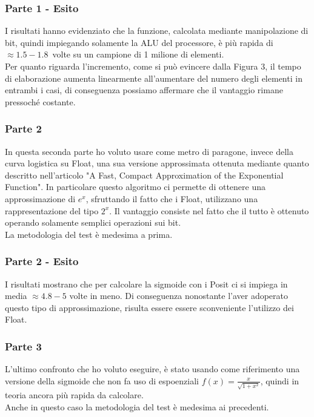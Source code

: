 \documentclass[a4paper,11pt]{article}
\begin{document}
\subsubsection{Parte 1 - Esito}


I risultati hanno evidenziato che la funzione, calcolata mediante manipolazione di bit, quindi impiegando solamente la ALU del processore, è più rapida di $\approx1.5-1.8$\ volte su un campione di 1 milione di elementi. \\
Per quanto riguarda l'incremento, come si può evincere dalla Figura 3, il tempo di elaborazione aumenta linearmente all'aumentare del numero degli elementi in entrambi i casi, di conseguenza possiamo affermare che il vantaggio rimane pressoché costante.

 
\subsubsection{Parte 2}

In questa seconda parte ho voluto usare come metro di paragone, invece della curva logistica su Float, una sua versione approssimata ottenuta mediante quanto descritto nell'articolo "A Fast, Compact Approximation of the Exponential Function"\cite{afast}. In particolare questo algoritmo ci permette di ottenere una approssimazione di $e^{x}$, sfruttando il fatto che i Float, utilizzano una rappresentazione del tipo $2^x$. Il vantaggio consiste nel fatto che il tutto è ottenuto operando solamente semplici operazioni sui bit.\\
La metodologia del test è medesima a prima.
\subsubsection{Parte 2 - Esito}

I risultati mostrano che per calcolare la sigmoide con i Posit ci si impiega in media $\approx4.8-5$ volte in meno. Di conseguenza nonostante l'aver adoperato questo tipo di approssimazione, risulta essere essere sconveniente l'utilizzo dei Float.

\subsubsection{Parte 3}
L'ultimo confronto che ho voluto eseguire, è stato usando come riferimento una versione della sigmoide che non fa uso di espoenziali $f(x) = \frac{x}{\sqrt{1+x^{2}}}$, quindi in teoria ancora più rapida da calcolare.\\
Anche in questo caso la metodologia del test è medesima ai precedenti.
\end{document}
